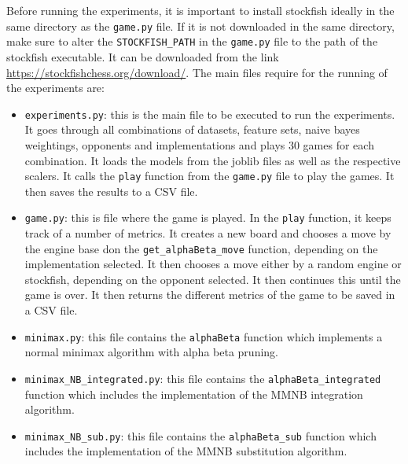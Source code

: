 Before running the experiments, it is important to install stockfish ideally in the same directory as the \texttt{game.py} file. If it is not downloaded in the same directory, make sure to alter the \texttt{STOCKFISH\_PATH} in the \texttt{game.py} file to the path of the stockfish executable. It can be downloaded from the link \url{https://stockfishchess.org/download/}.
The main files require for the running of the experiments are:

\begin{itemize}
    \item \texttt{experiments.py}: this is the main file to be executed to run the experiments. It goes through all combinations of datasets, feature sets, naive bayes weightings, opponents and implementations and plays 30 games for each combination. It loads the models from the joblib files as well as the respective scalers. It calls the \texttt{play} function from the \texttt{game.py} file to play the games. It then saves the results to a CSV file.
    \item \texttt{game.py}: this is file where the game is played. In the \texttt{play} function, it keeps track of a number of metrics. It creates a new board and chooses a move by the engine base don the \texttt{get\_alphaBeta\_move} function, depending on the implementation selected. It then chooses a move either by a random engine or stockfish, depending on the opponent selected. It then continues this until the game is over. It then returns the different metrics of the game to be saved in a CSV file. 
    \item \texttt{minimax.py}: this file contains the \texttt{alphaBeta} function which implements a normal minimax algorithm with alpha beta pruning.
    \item \texttt{minimax\_NB\_integrated.py}: this file contains the \texttt{alphaBeta\_integrated} function which includes the implementation of the MMNB integration algorithm.
    \item \texttt{minimax\_NB\_sub.py}: this file contains the \texttt{alphaBeta\_sub} function which includes the implementation of the MMNB substitution algorithm.
\end{itemize}



